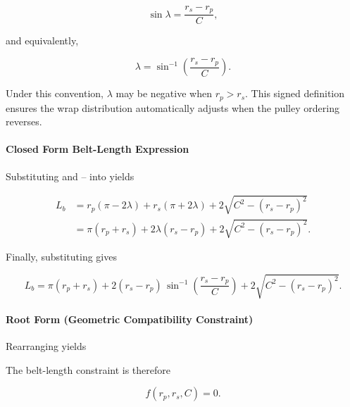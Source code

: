 \documentclass[11pt]{article}
\numberwithin{equation}{section}
\begin{document}
\begin{equation}
\sin\lambda = \frac{r_s - r_p}{C},
\label{eq:lambda_def}
\end{equation}

and equivalently,

\begin{equation}
\lambda = \sin^{-1}\!\left(\frac{r_s - r_p}{C}\right).
\label{eq:lambda_asin}
\end{equation}

Under this convention, $\lambda$ may be negative when $r_p > r_s$.
This signed definition ensures the wrap distribution automatically adjusts
when the pulley ordering reverses.

\paragraph{Closed Form Belt-Length Expression}

Substituting  and --
into  yields

\begin{align}
L_b
&= r_p(\pi - 2\lambda)
 + r_s(\pi + 2\lambda)
 + 2\sqrt{C^2 - (r_s - r_p)^2} \nonumber\\
&= \pi(r_p + r_s)
 + 2\lambda (r_s - r_p)
 + 2\sqrt{C^2 - (r_s - r_p)^2}. 
\label{eq:belt_length_subbed}
\end{align}

Finally, substituting  gives

\begin{equation}
L_b =
\pi(r_p + r_s)
+ 2(r_s - r_p)\,
\sin^{-1}\!\left(\frac{r_s - r_p}{C}\right)
+ 2\sqrt{C^2 - (r_s - r_p)^2}.
\label{eq:belt_length_final}
\end{equation}

\paragraph{Root Form (Geometric Compatibility Constraint)}

Rearranging  yields


The belt-length constraint is therefore

\begin{equation}
f(r_p, r_s, C) = 0.
\label{eq:belt_length_constraint}
\end{equation}
\end{document}
